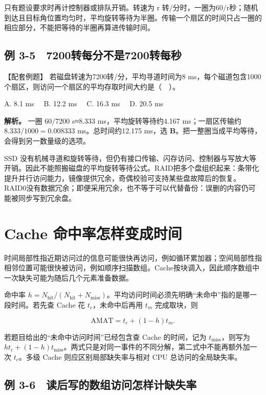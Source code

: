 只有题设要求时再计控制器或排队开销。转速为 r 转/分时，一圈为60/r秒；随机到达且目标角位置均匀时，平均旋转等待为半圈。传输一个扇区的时间只占一圈的相应部分，不能把等待的半圈再算进传输时间。

\subsection{例 3-5　7200转每分不是7200转每秒}\label{CO03-13}

\begin{example}[配套例题]

【配套例题】 若磁盘转速为7200转/分，平均寻道时间为8 ms，每个磁道包含1000个扇区，则访问一个扇区的平均存取时间大约是（　）。

A. 8.1 ms　 B. 12.2 ms　 C. 16.3 ms　 D. 20.5 ms

\end{example}

\textbf{解析。} 一圈 \(60/7200\) s≈8.333 ms，平均旋转等待约4.167 ms；一扇区传输约 \(8.333/1000=0.008333\) ms。总时间约12.175 ms，选 \textbf{B}。把一整圈当成平均等待，会得到另一数量级的选项。

SSD 没有机械寻道和旋转等待，但仍有接口传输、闪存访问、控制器与写放大等开销。因此不能照搬磁盘的平均旋转等待公式。RAID把多个盘组织起来：条带化提升并行访问能力，镜像提供冗余，奇偶校验可支持某些盘故障后的恢复。RAID0没有数据冗余；即便采用冗余，也不等于可以代替备份：误删的内容仍可能被同步写到冗余盘。

\section{Cache 命中率怎样变成时间}\label{CO03-14}

时间局部性指近期访问过的信息可能很快再访问，例如循环累加器；空间局部性指相邻位置可能很快被访问，例如顺序扫描数组。Cache按块调入，因此顺序数组中一次缺失可能为随后几个元素准备数据。

命中率 \(h=N_{\mathrm{hit}}/(N_{\mathrm{hit}}+N_{\mathrm{miss}})\)。平均访问时间必须先明确``未命中''指的是哪一段时间。若先查 Cache 花 \(t_c\)，未命中后再用 \(t_m\) 完成取块，则

\[
\mathrm{AMAT}=t_c+(1-h)t_m.
\]

若题目给出的``未命中访问时间''已经包含查 Cache 的时间，记为 \(t_{\mathrm{miss}}\)，则写为 \(ht_c+(1-h)t_{\mathrm{miss}}\)。两式只是对同一事件的不同分解，第二式中不能再额外加一次 \(t_c\)。多级 Cache 则应区别局部缺失率与相对 CPU 总访问的全局缺失率。

\subsection{例 3-6　读后写的数组访问怎样计缺失率}\label{CO03-15}

